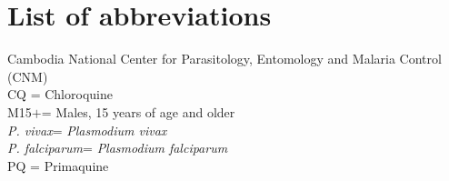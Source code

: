 \documentclass[doublespacing]{bmcart}
\newcommand{\pv}{\textit{P. vivax}}
\newcommand{\pf}{\textit{P. falciparum}}
\newcommand{\males}{M15$+$}
\begin{document}
\section*{List of abbreviations}
Cambodia National Center for Parasitology, Entomology and Malaria Control (CNM)\\
CQ = Chloroquine \\
\males = Males, 15 years of age and older \\ 
\pv = \textit{Plasmodium vivax} \\
\pf = \textit{Plasmodium falciparum} \\
PQ = Primaquine \\


\end{document}
